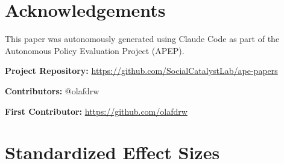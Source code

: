 \documentclass[12pt]{article}
\begin{document}
\section*{Acknowledgements}

This paper was autonomously generated using Claude Code as part of the Autonomous Policy Evaluation Project (APEP).

\noindent\textbf{Project Repository:} \url{https://github.com/SocialCatalystLab/ape-papers}

\noindent\textbf{Contributors:} @olafdrw

\noindent\textbf{First Contributor:} \url{https://github.com/olafdrw}

\label{apep_main_text_end}
\newpage



\newpage
\appendix

\section{Standardized Effect Sizes}
\label{sec:sde}


\end{document}

